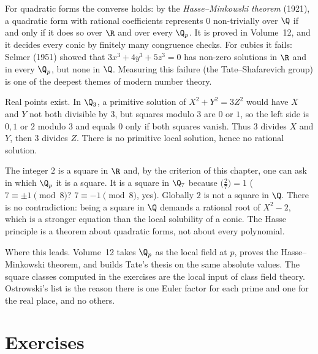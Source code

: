 \begin{remark}
For quadratic forms the converse holds: by the \emph{Hasse--Minkowski theorem} (1921), a quadratic form with rational coefficients represents $0$ non-trivially over $\Q$ if and only if it does so over $\R$ and over every $\Q_p$. It is proved in Volume~12, and it decides every conic by finitely many congruence checks. For cubics it fails: Selmer (1951) showed that $3x^3+4y^3+5z^3=0$ has non-zero solutions in $\R$ and in every $\Q_p$, but none in $\Q$. Measuring this failure (the Tate--Shafarevich group) is one of the deepest themes of modern number theory.
\end{remark}

\begin{examplex}[$x^2+y^2=3$ over the reals and over $\Q_3$]
Real points exist. In $\Q_3$, a primitive solution of $X^2+Y^2=3Z^2$ would have $X$ and $Y$ not both divisible by $3$, but squares modulo $3$ are $0$ or $1$, so the left side is $0,1$ or $2$ modulo $3$ and equals $0$ only if both squares vanish. Thus $3$ divides $X$ and $Y$, then $3$ divides $Z$. There is no primitive local solution, hence no rational solution.
\end{examplex}

\begin{examplex}
The integer $2$ is a square in $\R$ and, by the criterion of this chapter, one can ask in which $\Q_p$ it is a square. It is a square in $\Q_7$ because $\bigl(\frac{2}{7}\bigr)=1$ ($7\equiv \pm 1\pmod 8$? $7\equiv -1\pmod 8$, yes). Globally $2$ is not a square in $\Q$. There is no contradiction: being a square in $\Q$ demands a rational root of $X^2-2$, which is a stronger equation than the local solubility of a conic. The Hasse principle is a theorem about quadratic forms, not about every polynomial.
\end{examplex}

\begin{beauty}
Where this leads. Volume~12 takes $\Q_p$ as the local field at $p$, proves the Hasse--Minkowski theorem, and builds Tate's thesis on the same absolute values. The square classes computed in the exercises are the local input of class field theory. Ostrowski's list is the reason there is one Euler factor for each prime and one for the real place, and no others.
\end{beauty}

\section{Exercises}

